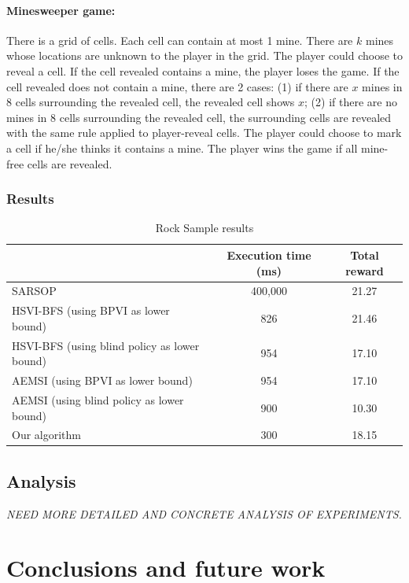 \documentclass{article}
\begin{document}
\paragraph{Minesweeper game:} There is a grid of cells. Each cell can contain at most 1 mine.
There are $k$ mines whose locations are unknown to the player in the grid. The player could choose to 
reveal a cell. If the cell revealed contains a mine, the player loses the game. If the cell 
revealed does not contain a mine, there are 2 cases: (1) if there are $x$ mines in 8 cells 
surrounding the revealed cell, the revealed cell shows $x$; (2) if there are no mines in 8 
cells surrounding the revealed cell, the surrounding cells are revealed with the same rule 
applied to player-reveal cells. The player could choose to mark a cell if he/she thinks it
contains a mine. The player wins the game if all mine-free cells are revealed.


\subsubsection{Results}

\begin{table}[H]
\caption{Rock Sample results}
\begin{center}
	\begin{tabular} {| l | c | c |}
		\hline
			& Execution time (ms) & Total reward\\ 
		\hline
		SARSOP & 400,000 & 21.27\\
		HSVI-BFS (using BPVI as lower bound) & 826 & 21.46\\
		HSVI-BFS (using blind policy as lower bound) & 954 & 17.10\\
		AEMSI (using BPVI as lower bound) & 954 & 17.10\\
		AEMSI (using blind policy as lower bound) & 900 & 10.30\\
		Our algorithm & 300 & 18.15\\ 
		\hline
	\end{tabular}
\end{center}
\end{table}


\subsection{Analysis}

\emph{NEED MORE DETAILED AND CONCRETE ANALYSIS OF EXPERIMENTS.}


\section{Conclusions and future work}
\end{document}
